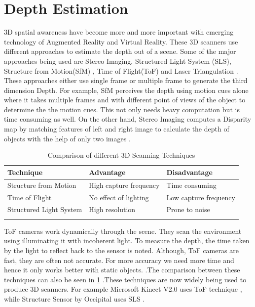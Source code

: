 \section{Depth Estimation}
3D spatial awareness have become more and more important with emerging technology of Augmented Reality and Virtual Reality. These 3D scanners use different approaches to estimate the depth out of a scene. Some of the major approaches being used are Stereo Imaging\cite{stereoimaging}, Structured Light System (SLS), Structure from Motion(SfM) \cite{sfm}, Time of Flight(ToF) \cite{timeofflight} and Laser Triangulation \cite{3DLasertechnique}. These approaches either use single frame or multiple frame to generate the third dimension Depth. For example, SfM perceives the depth using motion cues alone where it takes multiple frames and with different point of views of the object to determine the the motion cues\cite{sfm}. This not only needs heavy computation but is time consuming as well. On the other hand, Stereo Imaging computes a Disparity map by matching features of left and right image to calculate the depth of objects with the help of only two images \cite{stereoimaging}.\\
\begin{table}[h]
\begin{tabular}{@{}lll@{}}
\toprule
\textbf{Technique}                    & \textbf{Advantage}           & \textbf{Disadvantage}         \\ \midrule
Structure from Motion          & High capture frequency & Time consuming                 \\
Time of Flight       & No effect of lighting & Low capture frequency     \\
Structured Light System        & High resolution   & Prone to noise                 \\ 
                            &                     &                                               
\end{tabular}
\caption{Comparison of different 3D Scanning Techniques} 
\label{table:3DScanning}
\end{table}
ToF cameras work dynamically through the scene. They scan the environment using illuminating it with incoherent light. To measure the depth, the time taken by the light to reflect back to the sensor is noted. Although, ToF cameras are fast, they are often not accurate. For more accuracy we need more time and hence it only works better with static objects. \cite{tof2} \nocite{Why give a short info and cite}.The comparison between these techniques can also be seen in \ref{table:3DScanning} .These techniques are now widely being used to produce 3D scanners. For example Microsoft Kinect V2.0 uses ToF technique \cite{kinecttof}, while Structure Sensor by Occipital uses SLS \cite{Kalantari}.\\

